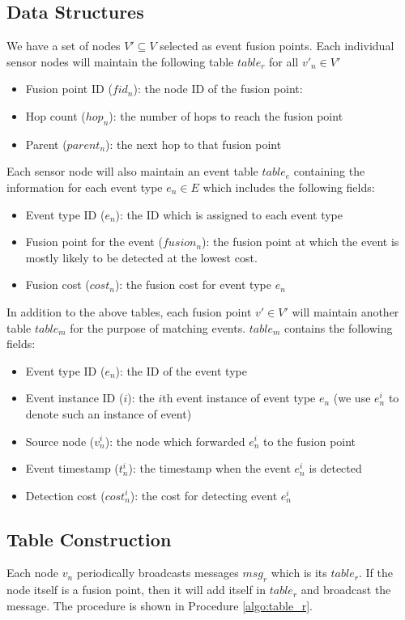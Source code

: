 \subsection{Data Structures}
We have a set of nodes \(V'\subseteq V\) selected as event fusion points. Each individual sensor nodes will maintain the following table \(table_r\) for all \(v'_n\in V'\)
\begin{itemize}
\item Fusion point ID (\(fid_n\)): the node ID of the fusion point:
\item	Hop count (\(hop_n\)): the number of hops to reach the fusion point
\item	Parent (\(parent_n\)): the next hop to that fusion point\\
\end{itemize}
Each sensor node will also maintain an event table \(table_e\) containing the information for each event type \(e_n\in E\) which includes the following fields:
\begin{itemize}
\item Event type ID (\(e_n\)): the ID which is assigned to each event type
\item Fusion point for the event (\(fusion_n\)): the fusion point at which the event is mostly likely to be detected at the lowest cost.
\item Fusion cost (\(cost_n\)): the fusion cost for event type \(e_n\)\\
\end{itemize}
In addition to the above tables, each fusion point \(v'\in V'\) will maintain another table \(table_m\) for the purpose of matching events. \(table_m\) contains the following fields:
\begin{itemize}
\item Event type ID (\(e_n\)): the ID of the event type
\item Event instance ID (\(i\)): the \(i\)th event instance of event type \(e_n\) (we use \(e_n^i\) to denote such an instance of event)
\item Source node (\(v_n^i\)): the node which forwarded \(e_n^i\) to the fusion point
\item Event timestamp (\(t_n^i\)): the timestamp when the event \(e_n^i\) is detected
\item Detection cost (\(cost_n^i\)): the cost for detecting event \(e_n^i\)
\end{itemize}

\subsection{Table Construction}
Each node \(v_n\) periodically broadcasts messages \(msg_r\) which is its \(table_r\). If the node itself is a fusion point, then it will add itself in \(table_r\) and broadcast the message. The procedure is shown in Procedure \ref{algo:table_r}.


